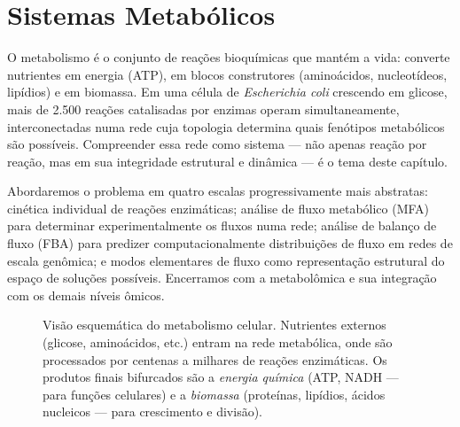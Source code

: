 \chapter{Sistemas Metabólicos}
\label{cap:08}

O metabolismo é o conjunto de reações bioquímicas que mantém a vida: converte nutrientes
em energia (ATP), em blocos construtores (aminoácidos, nucleotídeos, lipídios) e em
biomassa. Em uma célula de \textit{Escherichia coli} crescendo em glicose, mais de 2.500
reações catalisadas por enzimas operam simultaneamente, interconectadas numa rede cuja
topologia determina quais fenótipos metabólicos são possíveis. Compreender essa rede como
sistema --- não apenas reação por reação, mas em sua integridade estrutural e dinâmica ---
é o tema deste capítulo.

Abordaremos o problema em quatro escalas progressivamente mais abstratas: cinética
individual de reações enzimáticas; análise de fluxo metabólico (MFA) para determinar
experimentalmente os fluxos numa rede; análise de balanço de fluxo (FBA) para predizer
computacionalmente distribuições de fluxo em redes de escala genômica; e modos elementares
de fluxo como representação estrutural do espaço de soluções possíveis. Encerramos com
a metabolômica e sua integração com os demais níveis ômicos.

\begin{figure}[htbp]
\centering
{}
\caption{Visão esquemática do metabolismo celular. Nutrientes externos (glicose, aminoácidos, etc.) entram na rede metabólica, onde são processados por centenas a milhares de reações enzimáticas. Os produtos finais bifurcados são a \emph{energia química} (ATP, NADH --- para funções celulares) e a \emph{biomassa} (proteínas, lipídios, ácidos nucleicos --- para crescimento e divisão).}
\label{fig:08-metabolismo}
\end{figure}

